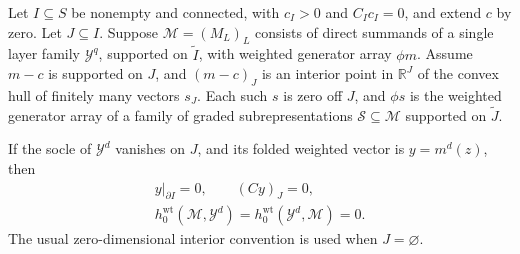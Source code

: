 \begin{lemma}[Separation]
\label{null:separation}
Let $I\subseteq S$ be nonempty and connected, with $c_I>0$ and
$C_Ic_I=0$, and extend $c$ by zero.  Let $J\subseteq I$.
Suppose $\mathcal M=(M_L)_L$ consists of direct summands of a single
layer family $\mathcal Y^q$, supported on $\widetilde I$, with
weighted generator array $\phi m$.  Assume $m-c$ is supported on
$J$, and $(m-c)_J$ is an interior point in $\mathbb R^J$ of the
convex hull of finitely many vectors $s_J$.  Each such $s$ is zero
off $J$, and $\phi s$ is the weighted generator array of a family
of graded subrepresentations $\mathcal S\subseteq\mathcal M$
supported on $\widetilde J$.

If the socle of $\mathcal Y^d$ vanishes on $J$, and its folded
weighted vector is $y=m^d(z)$, then
\begin{equation}
 \begin{gathered}
 y|_{\partial I}=0,\qquad (Cy)_J=0,\\
 h_0^{\mathrm{wt}}(\mathcal M,\mathcal Y^d)
   =h_0^{\mathrm{wt}}(\mathcal Y^d,\mathcal M)=0.
 \end{gathered}
 \label{null:separation-conclusions}
\end{equation}
The usual zero-dimensional interior convention is used when
$J=\varnothing$.
\end{lemma}

